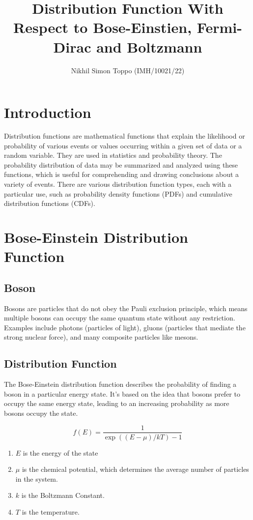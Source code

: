 \documentclass{article}
\title{Distribution Function With Respect to Bose-Einstien, Fermi-Dirac and Boltzmann}
\author{Nikhil Simon Toppo (IMH/10021/22)}
\date{}
\begin{document}
\maketitle

\newpage

\section*{Introduction}

Distribution functions are mathematical functions that explain the likelihood
or probability of various events or values occurring within a given set of data
or a random variable. They are used in statistics and probability theory. The
probability distribution of data may be summarized and analyzed using these
functions, which is useful for comprehending and drawing conclusions about a
variety of events. There are various distribution function types, each with a
particular use, such as probability density functions (PDFs) and cumulative
distribution functions (CDFs).

\section{Bose-Einstein Distribution Function}

\subsection*{Boson}
Bosons are particles that do not obey the Pauli exclusion principle, which
means multiple bosons can occupy the same quantum state without any
restriction. Examples include photons (particles of light), gluons (particles
that mediate the strong nuclear force), and many composite particles like
mesons.

\subsection*{Distribution Function}
The Bose-Einstein distribution function describes the probability of finding a
boson in a particular energy state. It's based on the idea that bosons prefer
to occupy the same energy state, leading to an increasing probability as more
bosons occupy the state.

\begin{equation}
    f(E)=\frac{1}{\exp((E-\mu)/kT)-1}
\end{equation}

\begin{enumerate}
    \item $E$ is the energy of the state
    \item $\mu$ is the chemical potential, which determines the average number of particles in the system.
    \item $k$ is the Boltzmann Constant.
    \item $T$ is the temperature.
\end{enumerate}
\end{document}
